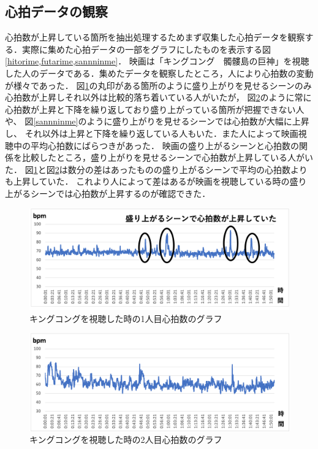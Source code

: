 \subsection{心拍データの観察}

心拍数が上昇している箇所を抽出処理するためまず収集した心拍データを観察する．実際に集めた心拍データの一部をグラフにしたものを表示する図\ref{hitorime,futarime,sannninme}．
映画は「キングコング　髑髏島の巨神」を視聴した人のデータである．集めたデータを観察したところ，人により心拍数の変動が様々であった．
図\ref{hitorime}の丸印がある箇所のように盛り上がりを見せるシーンのみ心拍数が上昇しそれ以外は比較的落ち着いている人がいたが，
図\ref{futarime}のように常に心拍数が上昇と下降を繰り返しており盛り上がっている箇所が把握できない人や、
図\ref{sannninme}のように盛り上がりを見せるシーンでは心拍数が大幅に上昇し、
それ以外は上昇と下降を繰り返している人もいた．また人によって映画視聴中の平均心拍数にばらつきがあった．
映画の盛り上がるシーンと心拍数の関係を比較したところ，盛り上がりを見せるシーンで心拍数が上昇している人がいた．
図\ref{hitorime}と図\ref{futarime}は数分の差はあったものの盛り上がるシーンで平均の心拍数よりも上昇していた．
これより人によって差はあるが映画を視聴している時の盛り上がるシーンでは心拍数が上昇するのが確認できた．

\begin{figure}[H]
    \centering
    \includegraphics[width=16cm]{images/chapter3/gurafusyuusei.png}
    \caption{キングコングを視聴した時の1人目心拍数のグラフ}
    \label{hitorime}
\end{figure}

\begin{figure}[H]
    \centering
    \includegraphics[width=16cm]{images/chapter3/gurafu.png}
    \caption{キングコングを視聴した時の2人目心拍数のグラフ}
    \label{futarime}
\end{figure}

